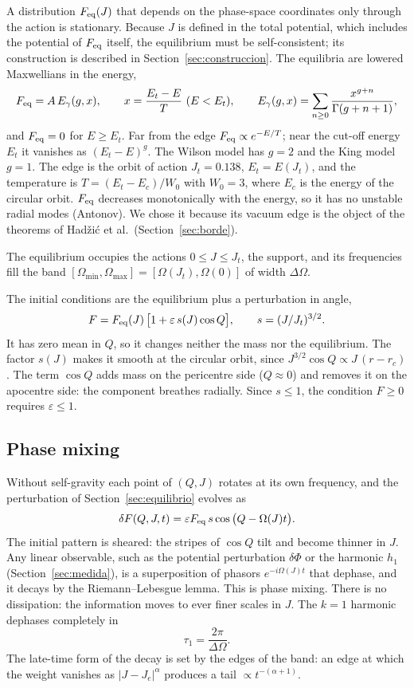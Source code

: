 \documentclass[11pt,a4paper]{article}
\begin{document}
A distribution $F_{\rm eq}(J)$ that depends on the phase-space coordinates only through
the action is stationary. Because $J$ is defined in the total potential, which includes
the potential of $F_{\rm eq}$ itself, the equilibrium must be self-consistent; its
construction is described in Section~\ref{sec:construccion}. The equilibria are lowered Maxwellians in the energy,
\[
  F_{\rm eq}=A\,E_\gamma(g,x),\qquad x=\frac{E_t-E}{T}\ (E<E_t),\qquad
  E_\gamma(g,x)=\sum_{n\ge0}\frac{x^{g+n}}{\Gamma(g+n+1)} ,
\]
and $F_{\rm eq}=0$ for $E\ge E_t$. Far from the edge $F_{\rm eq}\propto e^{-E/T}$; near
the cut-off energy $E_t$ it vanishes as $(E_t-E)^g$. The Wilson model has $g=2$ and the
King model $g=1$. The edge is the orbit of action $J_t=0.138$, $E_t=E(J_t)$, and the
temperature is $T=(E_t-E_c)/W_0$ with $W_0=3$, where $E_c$ is the energy of the circular
orbit. $F_{\rm eq}$ decreases monotonically with the energy, so it has no unstable radial
modes (Antonov). We chose it because its vacuum edge is the object of the theorems of
Hadžić et al.\ (Section~\ref{sec:borde}).

The equilibrium occupies the actions $0\le J\le J_t$, the support, and its frequencies
fill the band $[\Omega_{\min},\Omega_{\max}]=[\Omega(J_t),\Omega(0)]$ of width $\Delta\Omega$.

The initial conditions are the equilibrium plus a perturbation in angle,
\[
  F=F_{\rm eq}(J)\,\big[1+\varepsilon\,s(J)\cos Q\big],\qquad s=(J/J_t)^{3/2}.
\]
It has zero mean in $Q$, so it changes neither the mass nor the equilibrium. The factor
$s(J)$ makes it smooth at the circular orbit, since $J^{3/2}\cos Q\propto J\,(r-r_c)$.
The term $\cos Q$ adds mass on the pericentre side ($Q\approx0$) and removes it on the
apocentre side: the component breathes radially. Since $s\le1$, the condition
$F\ge0$ requires $\varepsilon\le1$.

\subsection{Phase mixing}
\label{sec:banda}

Without self-gravity each point of $(Q,J)$ rotates at its own
frequency, and the perturbation of Section~\ref{sec:equilibrio} evolves as
\[
  \delta F(Q,J,t)=\varepsilon F_{\rm eq}\,s\cos\big(Q-\Omega(J)t\big).
\]
The initial pattern is sheared: the stripes of $\cos Q$ tilt and become thinner in
$J$. Any linear observable, such as the potential perturbation $\delta\Phi$ or the
harmonic $h_1$ (Section~\ref{sec:medida}), is a superposition of phasors
$e^{-i\Omega(J)t}$ that dephase, and it decays by the Riemann--Lebesgue lemma. This is
phase mixing. There is no dissipation: the information moves to ever finer scales in
$J$. The $k=1$ harmonic dephases completely in
\[
  \tau_1=\frac{2\pi}{\Delta\Omega}.
\]
The late-time form of the decay is set by the edges of the
band: an edge at which the weight vanishes as $|J-J_e|^\alpha$ produces a tail
$\propto t^{-(\alpha+1)}$.
\end{document}
